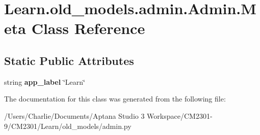 \hypertarget{class_learn_1_1old__models_1_1admin_1_1_admin_1_1_meta}{\section{Learn.\-old\-\_\-models.\-admin.\-Admin.\-Meta Class Reference}
\label{class_learn_1_1old__models_1_1admin_1_1_admin_1_1_meta}
}
\subsection*{Static Public Attributes}
\begin{DoxyCompactItemize}
\item 
\hypertarget{class_learn_1_1old__models_1_1admin_1_1_admin_1_1_meta_a0de4f88834b8b773bb1581f19e87a4bd}{string {\bfseries app\-\_\-label} \char`\"{}Learn\char`\"{}}\label{class_learn_1_1old__models_1_1admin_1_1_admin_1_1_meta_a0de4f88834b8b773bb1581f19e87a4bd}

\end{DoxyCompactItemize}


The documentation for this class was generated from the following file\-:\begin{DoxyCompactItemize}
\item 
/\-Users/\-Charlie/\-Documents/\-Aptana Studio 3 Workspace/\-C\-M2301-\/9/\-C\-M2301/\-Learn/old\-\_\-models/admin.\-py\end{DoxyCompactItemize}
